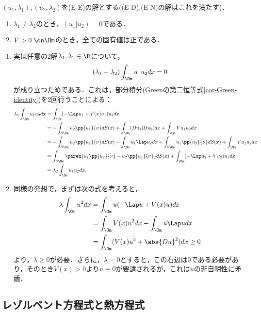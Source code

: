 \documentclass[uplatex,dvipdfmx]{jsreport}
\begin{document}
\begin{proposition}[固有関数の直交性]
    $(u_1,\lambda_1),(u_2,\lambda_2)$を(E-E)の解とする((E-D),(E-N)の解はこれを満たす)．
    \begin{enumerate}
        \item $\lambda_1\ne\lambda_2$のとき，$(u_1|u_2)=0$である．
        \item $V>0\;\on\Om$のとき，全ての固有値は正である．
    \end{enumerate}
\end{proposition}
\begin{Proof}\mbox{}
    \begin{enumerate}
        \item 実は任意の2解$\lambda_1,\lambda_2\in\R$について，
        \[(\lambda_1-\lambda_2)\int_\Om u_1u_2dx=0\]
        が成り立つためである．これは，部分積分(Greenの第二恒等式\ref{cor-Green-identity})を2回行うことによる：
        \begin{align*}
            \lambda_1\int_\Om u_1u_2dx&=\int_\Om(-\Lap u_1+V(x)u_1)u_2dx\\
            &=-\int_{\partial\Om}u_2\pp{u_1}{\nu}dS(x)+\int_\Om(Du_1|Du_2)dx+\int_\Om Vu_1u_2dx\\
            &=-\int_{\partial\Om}u_2\pp{u_1}{\nu}dS(x)-\int_\Om u_1\Lap u_2dx+\int_{\partial\Om}u_1\pp{u_2}{\nu}dS(x)+\int_\Om Vu_1u_2dx\\
            &=\int_{\partial\Om}\paren{u_1\pp{u_2}{\nu}-u_2\pp{u_1}{\nu}}dS(x)+\int_\Om(-\Lap u_2+Vu_2)u_1dx\\
            &=\lambda_2\int_\Om u_1u_2dx.
        \end{align*}
        \item 同様の発想で，まずは次の式を考えると，
        \begin{align*}
            \lambda\int_{\Om}u^2dx&=\int_{\Om}u(-\Lap u+V(x)u)dx\\
            &=\int_\Om V(x)u^2dx-\int_\Om u\Lap udx\\
            &=\int_\Om(V(x)u^2+\abs{Du}^2)dx\ge0
        \end{align*}
        より，$\lambda\ge0$が必要．さらに，$\lambda=0$とすると，この右辺は$0$である必要があり，そのとき$V(x)>0$より$u\equiv0$が要請されるが，これは$u$の非自明性に矛盾．
    \end{enumerate}
\end{Proof}

\subsection{レゾルベント方程式と熱方程式}
\end{document}

